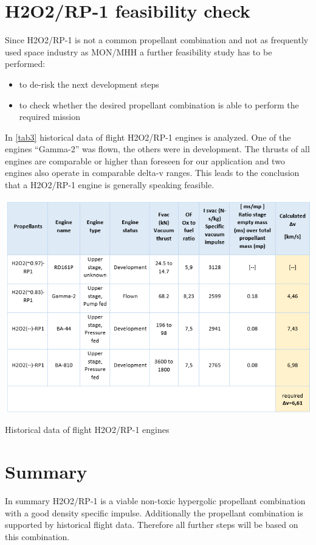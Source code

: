 \section{H2O2/RP-1 feasibility check}
\qquad Since H2O2/RP-1 is not a common propellant combination and not as frequently used space industry as MON/MHH a further feasibility study has to be performed:
\vspace{-15pt}
\begin{itemize}
	\itemsep0em
	\item	to de-risk the next development steps
	\item	to check whether the desired propellant combination is able to perform the required mission
\end{itemize}
\vspace{-15pt}
In \ref{tab3} historical data of flight H2O2/RP-1 engines is analyzed. One of the engines “Gamma-2” was flown, the others were in development. The thrusts of all engines are comparable or higher than foreseen for our application and two engines also operate in comparable delta-v ranges. This leads to the conclusion that a H2O2/RP-1 engine is generally speaking feasible.

\begin{table}[H]
	\centering\includegraphics[width=\linewidth]{histflightprop}
	\caption{Historical data of flight H2O2/RP-1 engines}\label{tab3}
\end{table}
\section{Summary}

\qquad In summary H2O2/RP-1 is a viable non-toxic hypergolic propellant combination with a good density specific impulse. Additionally the propellant combination is supported by historical flight data. Therefore all further steps will be based on this combination.